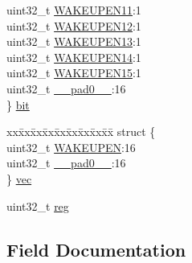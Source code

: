 \begin{DoxyCompactItemize}
\begin{tabbing}
\>uint32\_t \mbox{\hyperlink{union_e_i_c___w_a_k_e_u_p___type_ace2c2b5c340b6076d3f6eb2e790baee6}{WAKEUPEN11}}:1\\
\>uint32\_t \mbox{\hyperlink{union_e_i_c___w_a_k_e_u_p___type_a43ff8af944de1e54ff5abb586d2d8b7b}{WAKEUPEN12}}:1\\
\>uint32\_t \mbox{\hyperlink{union_e_i_c___w_a_k_e_u_p___type_ae4f997df25ff9f7921098ccb1da25c83}{WAKEUPEN13}}:1\\
\>uint32\_t \mbox{\hyperlink{union_e_i_c___w_a_k_e_u_p___type_ab1f61d49ceb75a553684c6cd175ce254}{WAKEUPEN14}}:1\\
\>uint32\_t \mbox{\hyperlink{union_e_i_c___w_a_k_e_u_p___type_ac125ec7205c789dc1213e8f3e1143991}{WAKEUPEN15}}:1\\
\>uint32\_t \mbox{\hyperlink{union_e_i_c___w_a_k_e_u_p___type_a3e57c2ef1c3ffb36722f000cc1156824}{\_\_pad0\_\_}}:16\\
\} \mbox{\hyperlink{union_e_i_c___w_a_k_e_u_p___type_ab5ba6559ddf2ce99806aa86df93bcd5a}{bit}}\\

\end{tabbing}\item 
\begin{tabbing}
xx\=xx\=xx\=xx\=xx\=xx\=xx\=xx\=xx\=\kill
struct \{\\
\>uint32\_t \mbox{\hyperlink{union_e_i_c___w_a_k_e_u_p___type_a5d1b141ea7590d46d6759f778752958b}{WAKEUPEN}}:16\\
\>uint32\_t \mbox{\hyperlink{union_e_i_c___w_a_k_e_u_p___type_a3e57c2ef1c3ffb36722f000cc1156824}{\_\_pad0\_\_}}:16\\
\} \mbox{\hyperlink{union_e_i_c___w_a_k_e_u_p___type_af5da0a9289c6263ba8a41775b701f94e}{vec}}\\

\end{tabbing}\item 
uint32\+\_\+t \mbox{\hyperlink{union_e_i_c___w_a_k_e_u_p___type_a6b91636401516a477989a336376d7b40}{reg}}
\end{DoxyCompactItemize}


\subsection{Field Documentation}
\mbox{\label{union_e_i_c___w_a_k_e_u_p___type_a3e57c2ef1c3ffb36722f000cc1156824}} 
